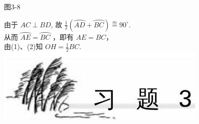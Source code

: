 \documentclass[10pt]{article}
\begin{document}
图3-8

由于 $A C \perp B D$, 故 $\frac{1}{2}(\overparen{A D}+\overparen{B C}) \stackrel{m}{=} 90^{\circ}$.\\
从而 $\overparen{A E}=\overparen{B C}$ ，即有 $A E=B C ，$\\
由(1)、(2)知 $O H=\frac{1}{2} B C$.\\
\includegraphics[max width=\textwidth, center]{2024_10_30_66b8e5e701da2093c133g-026(1)}
\end{document}
